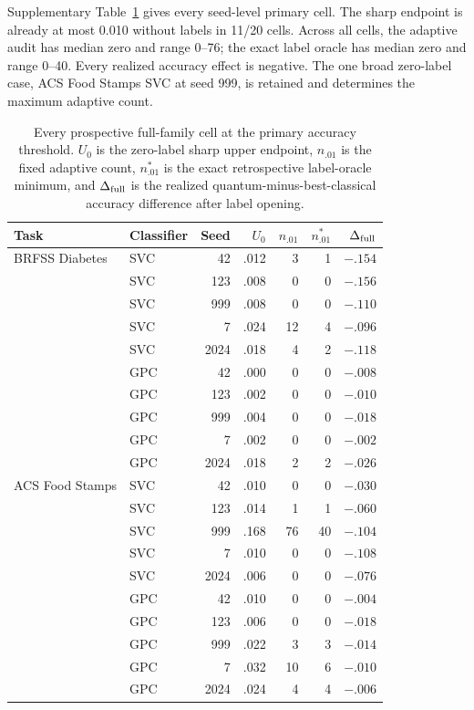 \documentclass[11pt]{article}
\begin{document}
Supplementary Table~\ref{supp:tab_v10_primary} gives every seed-level primary
cell. The sharp endpoint is already at most 0.010 without labels in 11/20
cells. Across all cells, the adaptive audit has median zero and range 0--76;
the exact label oracle has median zero and range 0--40. Every realized
accuracy effect is negative. The one broad zero-label case, ACS Food Stamps
SVC at seed 999, is retained and determines the maximum adaptive count.

\begin{table}[H]
\centering
\caption{Every prospective full-family cell at the primary accuracy threshold.
$U_0$ is the zero-label sharp upper endpoint, $n_{.01}$ is the fixed adaptive
count, $n^*_{.01}$ is the exact retrospective label-oracle minimum, and
$\Delta_{\rm full}$ is the realized quantum-minus-best-classical accuracy
difference after label opening.}
\label{supp:tab_v10_primary}
\scriptsize
\setlength{\tabcolsep}{3.5pt}
\begin{tabular}{llrrrrr}
\toprule
Task & Classifier & Seed & $U_0$ & $n_{.01}$ & $n^*_{.01}$ & $\Delta_{\rm full}$\\
\midrule
BRFSS Diabetes & SVC & 42   & .012 &  3 &  1 & $-.154$\\
                 & SVC & 123  & .008 &  0 &  0 & $-.156$\\
                 & SVC & 999  & .008 &  0 &  0 & $-.110$\\
                 & SVC & 7    & .024 & 12 &  4 & $-.096$\\
                 & SVC & 2024 & .018 &  4 &  2 & $-.118$\\
                 & GPC & 42   & .000 &  0 &  0 & $-.008$\\
                 & GPC & 123  & .002 &  0 &  0 & $-.010$\\
                 & GPC & 999  & .004 &  0 &  0 & $-.018$\\
                 & GPC & 7    & .002 &  0 &  0 & $-.002$\\
                 & GPC & 2024 & .018 &  2 &  2 & $-.026$\\
\addlinespace
ACS Food Stamps & SVC & 42   & .010 &  0 &  0 & $-.030$\\
                 & SVC & 123  & .014 &  1 &  1 & $-.060$\\
                 & SVC & 999  & .168 & 76 & 40 & $-.104$\\
                 & SVC & 7    & .010 &  0 &  0 & $-.108$\\
                 & SVC & 2024 & .006 &  0 &  0 & $-.076$\\
                 & GPC & 42   & .010 &  0 &  0 & $-.004$\\
                 & GPC & 123  & .006 &  0 &  0 & $-.018$\\
                 & GPC & 999  & .022 &  3 &  3 & $-.014$\\
                 & GPC & 7    & .032 & 10 &  6 & $-.010$\\
                 & GPC & 2024 & .024 &  4 &  4 & $-.006$\\
\bottomrule
\end{tabular}
\end{table}
\end{document}
